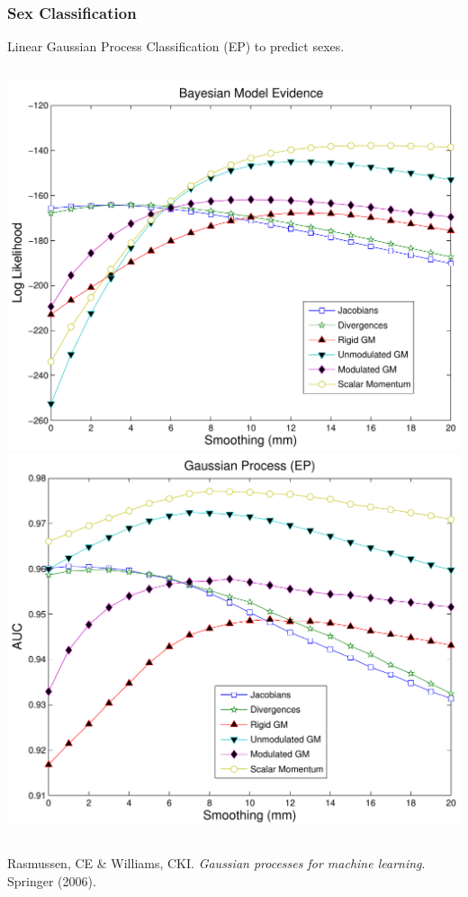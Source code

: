 \documentclass{beamer}
\begin{document}
\begin{frame}
\frametitle{Sex Classification}
Linear Gaussian Process Classification (EP) to predict sexes.
\begin{columns}[c]
\includegraphics[width=1\textwidth]{sex_loglikelihood}
\includegraphics[width=1\textwidth]{sex_auc_GP}
\end{columns}

\begin{tiny}
Rasmussen, CE \& Williams, CKI. \emph{Gaussian processes for machine learning}. Springer (2006).

\end{tiny}
\end{frame}
\end{document}
